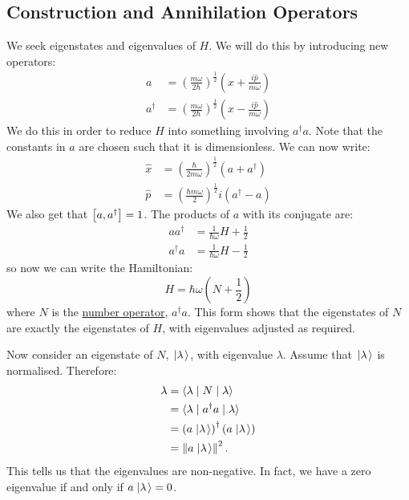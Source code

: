 \documentclass[../Main.tex]{subfiles}
\begin{document}
\subsection{Construction and Annihilation Operators}
We seek eigenstates and eigenvalues of $H$. We will do this by introducing new operators:
\begin{align*}
    a &= \left(\frac{m\omega}{2\hbar}\right)^\frac12 \left(\hat{x} + \frac{i\hat{p}}{m\omega}\right) \\
    a^\dagger &= \left(\frac{m\omega}{2\hbar}\right)^\frac12 \left(\hat{x} - \frac{i\hat{p}}{m\omega}\right)
\end{align*}
We do this in order to reduce $H$ into something involving $a^\dagger a$. Note that the constants in $a$ are chosen such that it is dimensionless. We can now write:
\begin{align*}
    \hat{x} &= \left(\frac{\hbar}{2m\omega}\right)^\frac12 (a + a^\dagger) \\
    \hat{p} &= \left(\frac{\hbar m\omega}{2}\right)^\frac12 i(a^\dagger - a)
\end{align*}
We also get that $\left[a, a^\dagger\right] = 1$. The products of $a$ with its conjugate are:
\begin{align*}
    aa^\dagger &= \frac{1}{\hbar \omega} H + \frac12 \\
    a^\dagger a &= \frac{1}{\hbar \omega} H - \frac12
\end{align*}
so now we can write the Hamiltonian:
\begin{equation*}
    H = \hbar \omega \left(N + \frac12\right)
\end{equation*}
where $N$ is the \underline{number operator}, $a^\dagger a$. This form shows that the eigenstates of $N$ are exactly the eigenstates of $H$, with eigenvalues adjusted as required.

Now consider an eigenstate of $N$, $\left.\left|\lambda\right.\right\rangle$, with eigenvalue $\lambda$. Assume that $\left.\left|\lambda\right.\right\rangle$ is normalised. Therefore:
\begin{align*}
    \lambda &= \langle\lambda\mid N\mid\lambda\rangle \\
    &= \langle\lambda\mid a^\dagger a\mid\lambda\rangle \\
    &= \left(a\left.\left|\lambda\right.\right\rangle\right)^\dagger \left(a\left.\left|\lambda\right.\right\rangle\right) \\
    &= \left\|a\left.\left|\lambda\right.\right\rangle\right\|^2.
\end{align*}
This tells us that the eigenvalues are non-negative. In fact, we have a zero eigenvalue if and only if $a\left.\left|\lambda\right.\right\rangle = 0$.
\end{document}

